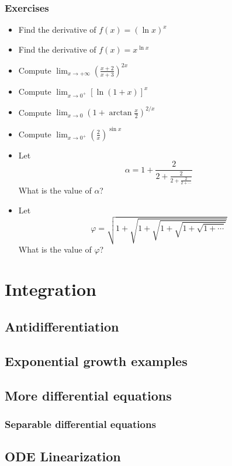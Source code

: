 \documentclass[twoside,openright,titlepage,a4paper]{book}
\begin{document}
\begin{sloppypar}
\subsection{Exercises}				
\begin{itemize}
\item Find the derivative of $f(x) = (\ln x)^x$
\item Find the derivative of $f(x) = x^{\ln x}$
\item Compute $ \displaystyle \lim_{x \to +\infty} \left( \frac{x+2}{x+3} \right)^{2x} $
\item Compute $ \displaystyle \lim_{x \to 0^+} \left[ \ln(1+x) \right]^{x} $
\item Compute $ \displaystyle \lim_{x \to 0} \left(1 + \arctan\frac{x}{2} \right)^{2/x} $
\item Compute $ \displaystyle \lim_{x \to 0^+} \left(\frac{2}{x}\right)^{\sin x} $
\item Let \[ \alpha =1 + \frac{2}{2+ \frac{2}{2+ \frac{2}{2+\cdots}}} \] What is the value of $\alpha$?
\item Let \[ \varphi = \sqrt{1+\sqrt{1+\sqrt{1+\sqrt{1+\sqrt{1+\cdots}}}}}\] What is the value of $\varphi$?
\end{itemize}

\chapter{Integration} \label{ChIntegration}
\section{Antidifferentiation} \label{ChIntegrationSecAntidifferentiation}
\section{Exponential growth examples} \label{ChIntegrationSecExponentialGrowthExamples}
\section{More differential equations} \label{ChIntegrationSecMoreDifferentialEquations}
\subsection{Separable differential equations} \label{ChIntegrationSecMoreDifferentialEquationsSubsecSeparableDifferentialEquations}
\section{ODE Linearization} \label{ChIntegrationSecODELinearization}

\end{sloppypar}
\end{document}
